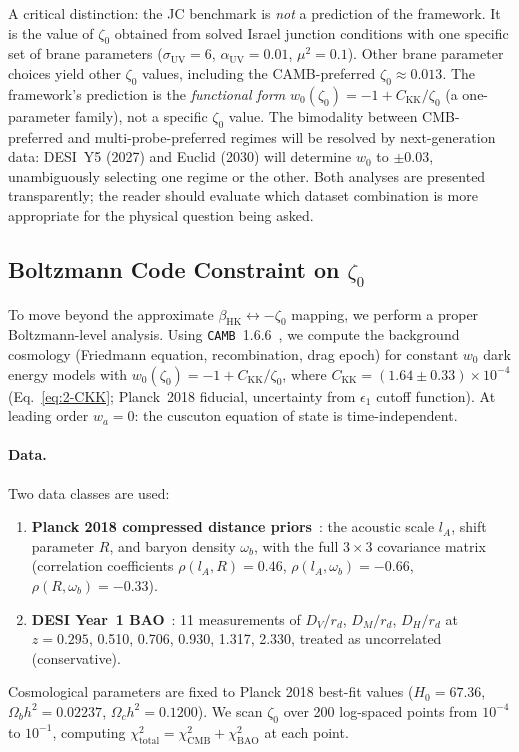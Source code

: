 A critical distinction: the JC benchmark is \emph{not} a prediction of the framework. It is the value of $\zeta_0$ obtained from solved Israel junction conditions with one specific set of brane parameters ($\sigma_\mathrm{UV} = 6$, $\alpha_\mathrm{UV} = 0.01$, $\mu^2 = 0.1$). Other brane parameter choices yield other $\zeta_0$ values, including the CAMB-preferred $\zeta_0 \approx 0.013$. The framework's prediction is the \emph{functional form} $w_0(\zeta_0) = -1 + C_\mathrm{KK}/\zeta_0$ (a one-parameter family), not a specific $\zeta_0$ value. The bimodality between CMB-preferred and multi-probe-preferred regimes will be resolved by next-generation data: DESI~Y5 (2027) and Euclid (2030) will determine $w_0$ to $\pm 0.03$, unambiguously selecting one regime or the other. Both analyses are presented transparently; the reader should evaluate which dataset combination is more appropriate for the physical question being asked.

\subsection{Boltzmann Code Constraint on $\zeta_0$}
\label{sec:2-boltzmann}

To move beyond the approximate $\beta_\mathrm{HK} \leftrightarrow -\zeta_0$ mapping, we perform a proper Boltzmann-level analysis. Using \texttt{CAMB}~1.6.6~\cite{ch2:Lewis2000}, we compute the background cosmology (Friedmann equation, recombination, drag epoch) for constant $w_0$ dark energy models with $w_0(\zeta_0) = -1 + C_\mathrm{KK}/\zeta_0$, where $C_\mathrm{KK} = (1.64 \pm 0.33) \times 10^{-4}$ (Eq.~\ref{eq:2-CKK}; Planck~2018 fiducial, uncertainty from $\epsilon_1$ cutoff function). At leading order $w_a = 0$: the cuscuton equation of state is time-independent.

\paragraph{Data.} Two data classes are used:
\begin{enumerate}
  \item \textbf{Planck 2018 compressed distance priors}~\cite{ch2:Planck2018}: the acoustic scale $l_A$, shift parameter $R$, and baryon density $\omega_b$, with the full $3 \times 3$ covariance matrix (correlation coefficients $\rho(l_A, R) = 0.46$, $\rho(l_A, \omega_b) = -0.66$, $\rho(R, \omega_b) = -0.33$).
  \item \textbf{DESI Year~1 BAO}~\cite{ch2:DESIY1}: 11 measurements of $D_V/r_d$, $D_M/r_d$, $D_H/r_d$ at $z = 0.295$, 0.510, 0.706, 0.930, 1.317, 2.330, treated as uncorrelated (conservative).
\end{enumerate}
Cosmological parameters are fixed to Planck 2018 best-fit values ($H_0 = 67.36$, $\Omega_b h^2 = 0.02237$, $\Omega_c h^2 = 0.1200$). We scan $\zeta_0$ over 200 log-spaced points from $10^{-4}$ to $10^{-1}$, computing $\chi^2_\mathrm{total} = \chi^2_\mathrm{CMB} + \chi^2_\mathrm{BAO}$ at each point.

